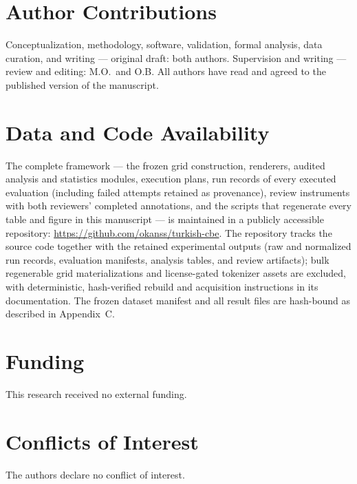 \documentclass[11pt]{article}
\begin{document}











\section*{Author Contributions}
Conceptualization, methodology, software, validation, formal analysis, data curation, and
writing --- original draft: both authors. Supervision and writing --- review and editing:
M.O.\ and O.B. All authors have read and agreed to the published version of the manuscript.

\section*{Data and Code Availability}
The complete framework --- the frozen grid construction, renderers, audited analysis and
statistics modules, execution plans, run records of every executed evaluation (including failed
attempts retained as provenance), review instruments with both reviewers' completed annotations,
and the scripts that regenerate every table and figure in this manuscript --- is maintained in a
publicly accessible repository: \url{https://github.com/okanss/turkish-cbe}. The repository
tracks the source code together with the retained experimental outputs (raw and normalized run
records, evaluation manifests, analysis tables, and review artifacts); bulk regenerable grid
materializations and license-gated tokenizer assets are excluded, with deterministic, hash-verified
rebuild and acquisition instructions in its documentation.
The frozen dataset manifest and all result files are hash-bound as described in Appendix~C.

\section*{Funding}
This research received no external funding.

\section*{Conflicts of Interest}
The authors declare no conflict of interest.




\appendix

\end{document}
